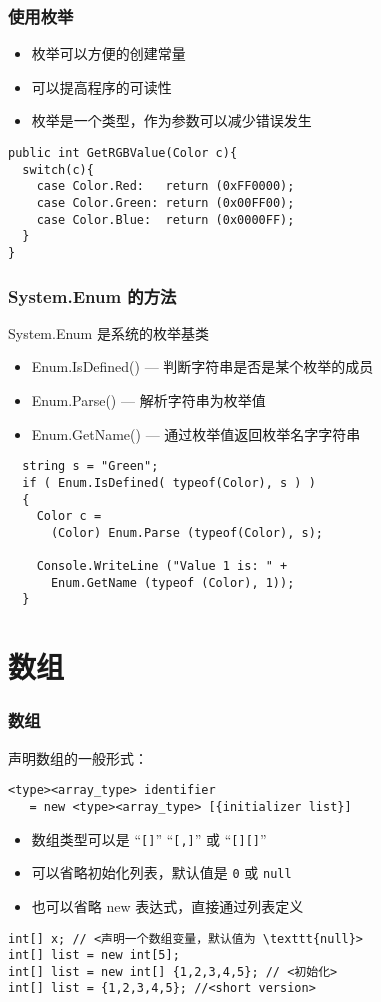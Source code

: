 \begin{frame}[fragile]
\frametitle{使用枚举}
\begin{itemize}
\item 枚举可以方便的创建常量
\item 可以提高程序的可读性
\item 枚举是一个类型，作为参数可以减少错误发生
\end{itemize}
\begin{lstlisting}
public int GetRGBValue(Color c){
  switch(c){
    case Color.Red:   return (0xFF0000);
    case Color.Green: return (0x00FF00);
    case Color.Blue:  return (0x0000FF);
  }
}
\end{lstlisting}

\end{frame}

\begin{frame}[fragile]
\frametitle{System.Enum 的方法}
System.Enum 是系统的枚举基类
\begin{itemize}
\item Enum.IsDefined() --- 判断字符串是否是某个枚举的成员
\item Enum.Parse() --- 解析字符串为枚举值
\item Enum.GetName() --- 通过枚举值返回枚举名字字符串
\end{itemize}
\pause
\begin{lstlisting}
  string s = "Green";
  if ( Enum.IsDefined( typeof(Color), s ) )
  {
    Color c =
      (Color) Enum.Parse (typeof(Color), s);

    Console.WriteLine ("Value 1 is: " +
      Enum.GetName (typeof (Color), 1));
  }
\end{lstlisting}
\end{frame}

\section{数组}

\begin{frame}[fragile]
\frametitle{数组}
声明数组的一般形式：
\begin{lstlisting}
<type><array_type> identifier
   = new <type><array_type> [{initializer list}]
\end{lstlisting}
\begin{itemize}
\item 数组类型可以是 ``\texttt{[]}'' ``\texttt{[,]}'' 或 ``\texttt{[][]}''
\item 可以省略初始化列表，默认值是 {\redwarn\texttt{0}} 或 {\redwarn\texttt{null}}
\item 也可以省略 new 表达式，直接通过列表定义
\end{itemize}
\pause
\begin{lstlisting}[escapeinside=<>]
int[] x; // <声明一个数组变量，默认值为 \texttt{null}>
int[] list = new int[5];
int[] list = new int[] {1,2,3,4,5}; // <初始化>
int[] list = {1,2,3,4,5}; //<short version>
\end{lstlisting}
\end{frame}

